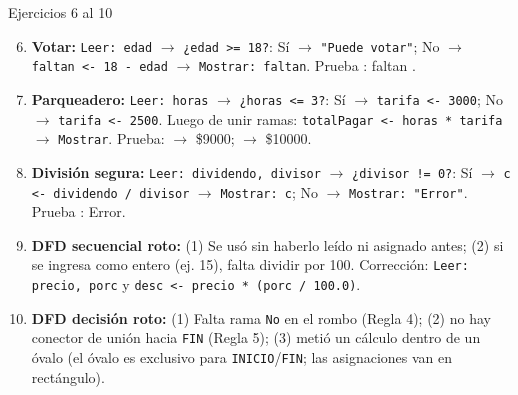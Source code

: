 \documentclass[11pt,letterpaper]{article}
\begin{document}
\begin{solucion}{Ejercicios 6 al 10}
\begin{enumerate}
  \setcounter{enumi}{5}
  \item \textbf{Votar:} \texttt{Leer: edad} $\rightarrow$ \texttt{¿edad >= 18?}: Sí $\rightarrow$ \texttt{"Puede votar"}; No $\rightarrow$ \texttt{faltan <- 18 - edad} $\rightarrow$ \texttt{Mostrar: faltan}. Prueba : faltan .
  \item \textbf{Parqueadero:} \texttt{Leer: horas} $\rightarrow$ \texttt{¿horas <= 3?}: Sí $\rightarrow$ \texttt{tarifa <- 3000}; No $\rightarrow$ \texttt{tarifa <- 2500}. Luego de unir ramas: \texttt{totalPagar <- horas * tarifa} $\rightarrow$ \texttt{Mostrar}. Prueba:  $\rightarrow$ \$9000;  $\rightarrow$ \$10000.
  \item \textbf{División segura:} \texttt{Leer: dividendo, divisor} $\rightarrow$ \texttt{¿divisor != 0?}: Sí $\rightarrow$ \texttt{c <- dividendo / divisor} $\rightarrow$ \texttt{Mostrar: c}; No $\rightarrow$ \texttt{Mostrar: "Error"}. Prueba : Error.
  \item \textbf{DFD secuencial roto:} (1) Se usó  sin haberlo leído ni asignado antes; (2) si se ingresa como entero (ej. 15), falta dividir por 100. Corrección: \texttt{Leer: precio, porc} y \texttt{desc <- precio * (porc / 100.0)}.
  \item \textbf{DFD decisión roto:} (1) Falta rama \texttt{No} en el rombo (Regla 4); (2) no hay conector de unión hacia \texttt{FIN} (Regla 5); (3) metió un cálculo dentro de un óvalo (el óvalo es exclusivo para \texttt{INICIO}/\texttt{FIN}; las asignaciones van en rectángulo).
\end{enumerate}
\end{solucion}
\end{document}
